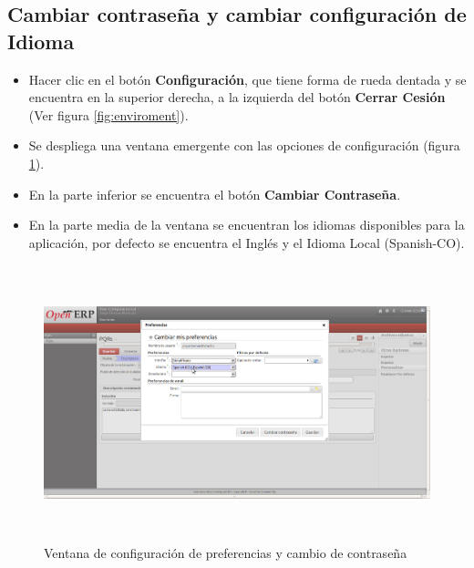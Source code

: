 \subsection {Cambiar contraseña y cambiar configuración de Idioma}
\begin{itemize}
 \item Hacer clic en el botón \textbf{Configuración}, que tiene forma de rueda dentada y se encuentra en la 
 superior derecha, a la izquierda del botón \textbf{Cerrar Cesión} (Ver figura \ref{fig:enviroment}).
 \item Se despliega una ventana emergente con las opciones de configuración (figura \ref{fig:configuracion}).
 \item En la parte inferior se encuentra el botón  \textbf{Cambiar Contraseña}.
 \item En la parte media de la ventana se encuentran los idiomas disponibles para la aplicación, por defecto
 se encuentra el Inglés y el Idioma Local (Spanish-CO). 
\end{itemize}

\begin{figure}[H]
 \centering
 \includegraphics[width=17cm,height=8cm]{./Imagenes/configuracion.png}
 \caption{Ventana de configuración de preferencias y cambio de contraseña}
 \label{fig:configuracion}
\end{figure}


